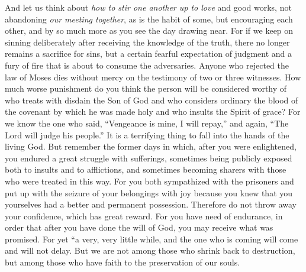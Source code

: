 \begin{biblechapter}
\verse And let us think about \textit{how to stir one another up to love} and good works,
\verse not abandoning \textit{our meeting together}, as is the habit of some, but encouraging each other, and by so much more as you see the day drawing near.
 For if we keep on sinning deliberately after receiving the knowledge of the truth, there no longer remains a sacrifice for sins,
\verse but a certain fearful expectation of judgment and a fury of fire that is about to consume the adversaries.
\verse Anyone who rejected the law of Moses dies without mercy on the testimony of two or three witnesses.
\verse How much worse punishment do you think the person will be considered worthy of who treats with disdain the Son of God and who considers ordinary the blood of the covenant by which he was made holy and who insults the Spirit of grace?
\verse For we know the one who said, “Vengeance is mine, I will repay,” and again, “The Lord will judge his people.”
\verse It is a terrifying thing to fall into the hands of the living God.
\verse But remember the former days in which, after you were enlightened, you endured a great struggle with sufferings,
\verse sometimes being publicly exposed both to insults and to afflictions, and sometimes becoming sharers with those who were treated in this way.
\verse For you both sympathized with the prisoners and put up with the seizure of your belongings with joy because you knew that you yourselves had a better and permanent possession.
\verse Therefore do not throw away your confidence, which has great reward.
\verse For you have need of endurance, in order that after you have done the will of God, you may receive what was promised.
\verse For yet
\verse “a very, very little while, 
and the one who is coming will come and will not delay.
\verse But we are not among those who shrink back to destruction, but among those who have faith to the preservation of our souls.
\end{biblechapter}

